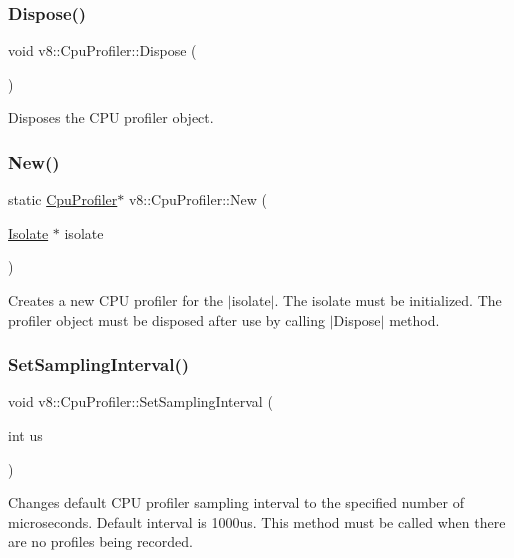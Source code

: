 \subsubsection{\texorpdfstring{Dispose()}{Dispose()}}
{\footnotesize\ttfamily void v8\+::\+Cpu\+Profiler\+::\+Dispose (\begin{DoxyParamCaption}{ }\end{DoxyParamCaption})}

Disposes the C\+PU profiler object. \mbox{\label{classv8_1_1CpuProfiler_a9850aa42c5580c686cde1555f09577aa}} 
\subsubsection{\texorpdfstring{New()}{New()}}
{\footnotesize\ttfamily static \mbox{\hyperlink{classv8_1_1CpuProfiler}{Cpu\+Profiler}}$\ast$ v8\+::\+Cpu\+Profiler\+::\+New (\begin{DoxyParamCaption}\item[{\mbox{\hyperlink{classv8_1_1Isolate}{Isolate}} $\ast$}]{isolate }\end{DoxyParamCaption})\hspace{0.3cm}{\ttfamily [static]}}

Creates a new C\+PU profiler for the $\vert$isolate$\vert$. The isolate must be initialized. The profiler object must be disposed after use by calling $\vert$\+Dispose$\vert$ method. \mbox{\label{classv8_1_1CpuProfiler_ac5b05c72fb899e20adfa7f8cc57f21fb}} 
\subsubsection{\texorpdfstring{Set\+Sampling\+Interval()}{SetSamplingInterval()}}
{\footnotesize\ttfamily void v8\+::\+Cpu\+Profiler\+::\+Set\+Sampling\+Interval (\begin{DoxyParamCaption}\item[{int}]{us }\end{DoxyParamCaption})}

Changes default C\+PU profiler sampling interval to the specified number of microseconds. Default interval is 1000us. This method must be called when there are no profiles being recorded. \mbox{\label{classv8_1_1CpuProfiler_a65ff4a18ab14143e094e2ea189facabd}} 
